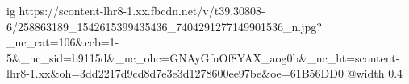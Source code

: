  
 
 
 
 

\ifcmt
  ig https://scontent-lhr8-1.xx.fbcdn.net/v/t39.30808-6/258863189_1542615399435436_7404291277149901536_n.jpg?_nc_cat=106&ccb=1-5&_nc_sid=b9115d&_nc_ohc=GNAyGfuOf8YAX_aog0b&_nc_ht=scontent-lhr8-1.xx&oh=3dd2217d9cd8d7e3e3d1278600ee97be&oe=61B56DD0
  @width 0.4
\fi
